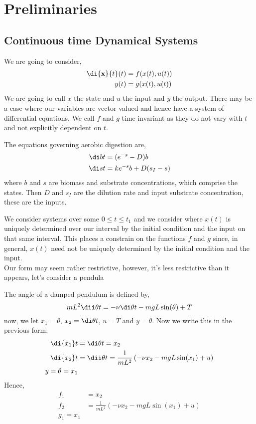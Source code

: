 
\section{Preliminaries}

\subsection{Continuous time Dynamical Systems}
We are going to consider,
\begin{align*}
  \di{\mathbf{x}}{t} (t) &= f(x(t), u(t))\\
  y(t) &= g(x(t), u(t))
\end{align*}
We are going to call $x$ the state and $u$ the input and $y$ the output. There may be a case where our variables are vector valued and hence have a system of differential equations. We call $f$ and $g$ time invariant as they do not vary with $t$ and not explicitly dependent on $t$.

\begin{eg}
  The equations governing aerobic digestion are,
  \begin{align*}
    \di b t &= (e^{-s} - D)b \\
    \di s t &= ke^{-s}b + D(s_I - s)
  \end{align*}
  where $b$ and $s$ are biomass and substrate concentrations, which comprise the states. Then $D$ and $s_I$ are the dilution rate and input substrate concentration, these are the inputs.
\end{eg}

We consider systems over some $0 \le t \le t_1$ and we consider where $x(t)$ is uniquely determined over our interval by the initial condition and the input on that same interval. This places a constrain on the functions $f$ and $g$ since, in general, $x(t)$ need not be uniquely determined by the initial condition and the input.\\

Our form may seem rather restrictive, however, it's less restrictive than it appears, let's consider a pendula
\begin{eg}
  The angle of a damped pendulum is defined by,
  $$ mL^2\dii \theta t = -\nu \di \theta t - mgL\sin(\theta) + T $$
  now, we let $x_1 = \theta$, $x_2 = \di \theta t$, $u = T$ and $y = \theta$. Now we write this in the previous form,
  \begin{align*}
    \di {x_1} t &= \di \theta t = x_2 \\
    \di {x_2} t &= \dii \theta t = \frac{1}{mL^2}\left( -\nu x_2 - mgL\sin (x_1) + u\right)\\
    y = \theta = x_1
  \end{align*}
  Hence,
  \begin{align}
    f_1 &= x_2\\
    f_2 &= \frac{1}{mL^2}\left( -\nu x_2 - mgL\sin (x_1) + u\right)\\
    g_1 = x_1
  \end{align}
\end{eg}

